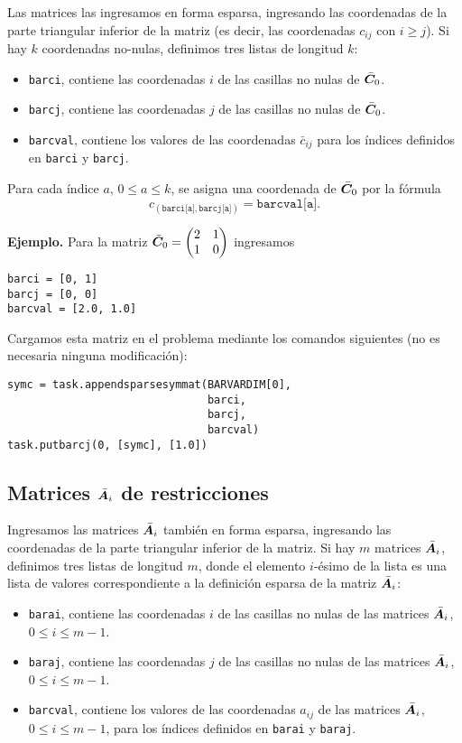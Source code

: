 \documentclass[11pt]{article}
\begin{document}
Las matrices las ingresamos en forma esparsa, ingresando las coordenadas de la parte triangular inferior de la matriz (es decir, las coordenadas $c_{ij}$ con $i \ge j$). Si hay $k$ coordenadas no-nulas, definimos tres listas de longitud $k$:
\begin{itemize}
\item \texttt{barci}, contiene las coordenadas $i$ de las casillas no nulas de $\bar {\bm{C}}_0$.
\item \texttt{barcj}, contiene las coordenadas $j$ de las casillas no nulas de $\bar {\bm{C}}_0$.
\item \texttt{barcval}, contiene los valores de las coordenadas $\bar c_{ij}$ para los índices definidos en \texttt{barci} y \texttt{barcj}.
\end{itemize}

Para cada índice $a$, $0 \le a \le k$, se asigna una coordenada de $\bar {\bm{C}}_0$ por la fórmula
    $$c_{(\texttt{barci[a]}, \texttt{barcj[a]})} = \texttt{barcval[a]}.$$
    
\textbf{Ejemplo.} Para la matriz $\bar {\bm{C}}_0 = \begin{pmatrix} 2 & 1 \\ 1 & 0 \end{pmatrix}$ ingresamos
\begin{lstlisting}
barci = [0, 1]
barcj = [0, 0]
barcval = [2.0, 1.0]
\end{lstlisting}

Cargamos esta matriz en el problema mediante los comandos siguientes (no es necesaria ninguna modificación):
\begin{lstlisting}
symc = task.appendsparsesymmat(BARVARDIM[0],
                               barci,
                               barcj,
                               barcval)
task.putbarcj(0, [symc], [1.0])
\end{lstlisting}

\subsection{Matrices $\bar {\bm{A}}_i$ de restricciones}
Ingresamos las matrices $\bar {\bm{A}}_i$ también en forma esparsa, ingresando las coordenadas de la parte triangular inferior de la matriz. Si hay $m$ matrices $\bar {\bm{A}}_i$, definimos tres listas de longitud $m$, donde el elemento $i$-ésimo de la lista es una lista de valores correspondiente a la definición esparsa de la matriz $\bar {\bm{A}}_i$:
\begin{itemize}
\item \texttt{barai}, contiene las coordenadas $i$ de las casillas no nulas de las matrices $\bar {\bm{A}}_i$, $0 \le i \le m-1$.
\item \texttt{baraj}, contiene las coordenadas $j$ de las casillas no nulas de las matrices $\bar {\bm{A}}_i$, $0 \le i \le m-1$.
\item \texttt{barcval}, contiene los valores de las coordenadas $a_{ij}$ de las matrices $\bar {\bm{A}}_i$, $0 \le i \le m-1$, para los índices definidos en \texttt{barai} y \texttt{baraj}.
\end{itemize}
\end{document}
